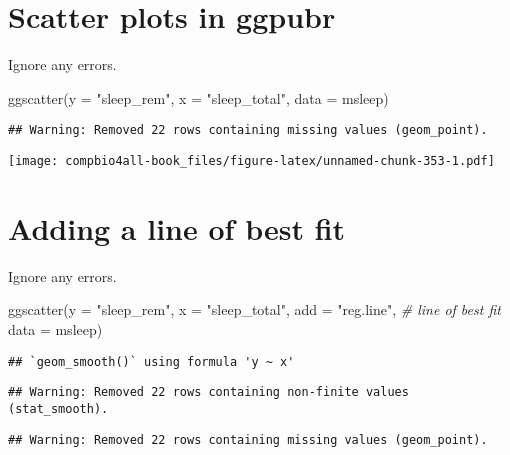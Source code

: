 \documentclass[
]{book}
\newenvironment{Shaded}{\begin{snugshade}}{\end{snugshade}}
\newcommand{\AttributeTok}[1]{\textcolor[rgb]{0.77,0.63,0.00}{#1}}
\newcommand{\CommentTok}[1]{\textcolor[rgb]{0.56,0.35,0.01}{\textit{#1}}}
\newcommand{\FunctionTok}[1]{\textcolor[rgb]{0.00,0.00,0.00}{#1}}
\newcommand{\NormalTok}[1]{#1}
\newcommand{\StringTok}[1]{\textcolor[rgb]{0.31,0.60,0.02}{#1}}
\begin{document}
\hypertarget{scatter-plots-in-ggpubr-1}{%
\section{Scatter plots in ggpubr}\label{scatter-plots-in-ggpubr-1}}

Ignore any errors.

\begin{Shaded}
\begin{Highlighting}[]
\FunctionTok{ggscatter}\NormalTok{(}\AttributeTok{y =} \StringTok{"sleep\_rem"}\NormalTok{,}
          \AttributeTok{x =} \StringTok{"sleep\_total"}\NormalTok{,}
          \AttributeTok{data =}\NormalTok{ msleep)}
\end{Highlighting}
\end{Shaded}

\begin{verbatim}
## Warning: Removed 22 rows containing missing values (geom_point).
\end{verbatim}

\texttt{[image: compbio4all-book\_files/figure-latex/unnamed-chunk-353-1.pdf]}

\hypertarget{adding-a-line-of-best-fit-1}{%
\section{Adding a line of best fit}\label{adding-a-line-of-best-fit-1}}

Ignore any errors.

\begin{Shaded}
\begin{Highlighting}[]
\FunctionTok{ggscatter}\NormalTok{(}\AttributeTok{y =} \StringTok{"sleep\_rem"}\NormalTok{,}
          \AttributeTok{x =} \StringTok{"sleep\_total"}\NormalTok{,}
          \AttributeTok{add =} \StringTok{"reg.line"}\NormalTok{,  }\CommentTok{\# line of best fit}
          \AttributeTok{data =}\NormalTok{ msleep)}
\end{Highlighting}
\end{Shaded}

\begin{verbatim}
## `geom_smooth()` using formula 'y ~ x'
\end{verbatim}

\begin{verbatim}
## Warning: Removed 22 rows containing non-finite values (stat_smooth).
\end{verbatim}

\begin{verbatim}
## Warning: Removed 22 rows containing missing values (geom_point).
\end{verbatim}
\end{document}
